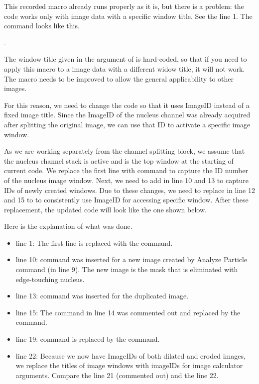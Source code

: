 

This recorded macro already runs properly as it is, but there is a problem: the code works only with image data with a specific window title. See the line 1. The command looks like this.   

. 

The window title given in the argument of  is hard-coded, so that if you need to apply this macro to a image data with a different widow title, it will not work. The macro
needs to be improved to allow the general applicability to other images. 

For this reason, we need to change the code so that it uses ImageID instead of a fixed image title. Since the ImageID of the nucleus channel was already acquired after splitting the original image, we can use that ID to activate a specific image window. 

As we are working separately from the channel splitting block, we assume that the nucleus channel stack is active and is the top window at the starting of current code. We replace the first line  with  command to capture the ID number of the nucleus image window. Next, we need to add  in line 10 and 13 to capture IDs of newly created windows. Due to these changes, we need to replace  in line 12 and 15 to  to consistently use ImageID for accessing specific window. After these replacement, the updated code will look like the one shown below. 




Here is the explanation of what was done. 
\begin{itemize}
  \item line 1: The first line is replaced with the  command. 
  \item line 10:  command was inserted for a new image created by Analyze Particle command (in line 9). The new image is the mask that is eliminated with edge-touching nucleus. 
  \item line 13:  command was inserted for the duplicated image. 
  \item line 15: The  command in line 14 was commented out and replaced by the  command. 
  \item line 19:  command is replaced by the  command. 
  \item line 22: Because we now have ImageIDs of both dilated and eroded images, we replace the titles of image windows with imageIDs for image calculator arguments. Compare the line 21 (commented out) and the line 22. 
\end{itemize}


